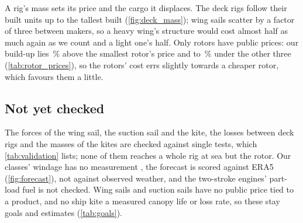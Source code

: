 \begin{table}[tbp]
\centering
\footnotesize
\caption{Every price paid or quoted for a rotor that we have read in full: its kind and year, the rotor's height and diameter, its price in thousands of today's USD by the euro area consumer price index \citep{eurostat2026hicp}, our build-up price of the same rotor, the price over the build-up, and the source of the price. Norsepower's and Anemoi's prices are of rotors installed, so they are set against our build-up with its \,\% for installation, and Anemoi's are mostly folding rotors \citep{tillig2020b,maritimeexec2026anemoi}.}
\label{tab:rotor_prices}
\end{table}

A rig's mass sets its price and the cargo it displaces. The deck rigs follow their built units up to the tallest built (\cref{fig:deck_mass}); wing sails scatter by a factor of three between makers, so a heavy wing's structure would cost almost half as much again as we count and a light one's half. Only rotors have public prices: our build-up lies \,\% above the smallest rotor's price and  to \,\% under the other three (\cref{tab:rotor_prices}), so the rotors' cost errs slightly towards a cheaper rotor, which favours them a little.

\subsection{Not yet checked}
\label{sec:val_open}

The forces of the wing sail, the suction sail and the kite, the losses between deck rigs and the masses of the kites are checked against single tests, which \cref{tab:validation} lists; none of them reaches a whole rig at sea but the rotor. Our classes' windage has no measurement \citep{blendermann1993}, the forecast is scored against ERA5 (\cref{fig:forecast}), not against observed weather, and the two-stroke engines' part-load fuel is not checked. Wing sails and suction sails have no public price tied to a product, and no ship kite a measured canopy life or loss rate, so these stay goals and estimates (\cref{tab:goals}).
